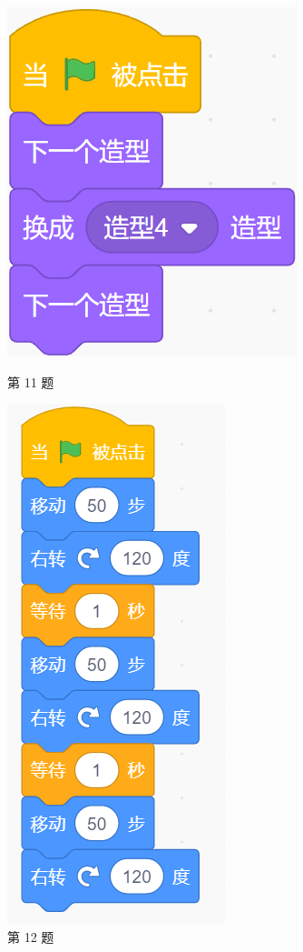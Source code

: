 \documentclass[10pt, a4paper]{article}
\begin{document}
\begin{enumerate}
\begin{figure}[htbp]
\begin{minipage}[t]{.24\textwidth}
\begin{minipage}[t]{.48\textwidth}
                    \includegraphics[width=.9\textwidth]{11-2.png}
                \end{minipage}
                \caption*{第 11 题}
            \end{minipage}
            \begin{minipage}[t]{.24\textwidth}
                \centering
                \includegraphics[width=.4\textwidth]{12.png}
                \caption*{第 12 题}
            \end{minipage}
        \end{figure}


\end{enumerate}
\end{document}
